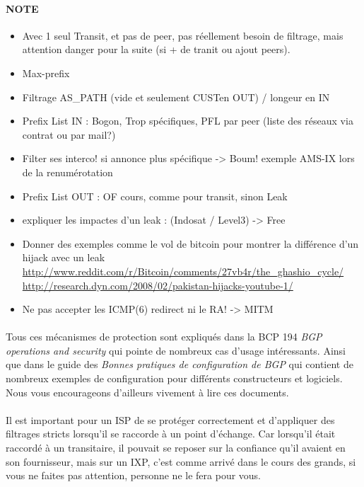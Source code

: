 \paragraph{NOTE}
\begin{itemize}
\item Avec 1 seul Transit, et pas de peer, pas réellement besoin de filtrage, mais attention danger pour la suite (si + de tranit ou ajout peers).
\item Max-prefix
\item Filtrage AS\_PATH (vide et seulement CUSTen OUT) / longeur en IN
\item Prefix List IN  : Bogon, Trop spécifiques, PFL par peer (liste des réseaux via contrat ou par mail?)
\item Filter ses interco! si annonce plus spécifique -> Boum! exemple AMS-IX lors de la renumérotation
\item Prefix List OUT : OF cours, comme pour transit, sinon Leak
\item expliquer les impactes d'un leak :  (Indosat / Level3) -> Free
\item Donner des exemples comme le vol de bitcoin pour montrer la différence d'un hijack avec un leak
\url{http://www.reddit.com/r/Bitcoin/comments/27vb4r/the_ghashio_cycle/}
\url{http://research.dyn.com/2008/02/pakistan-hijacks-youtube-1/}
\item Ne pas accepter les ICMP(6) redirect ni le RA! -> MITM
\end{itemize}

\paragraph{}
Tous ces mécanismes de protection sont expliqués dans la BCP 194 \emph{BGP operations and security} \cite{fenioux:BGPOPSEC} qui pointe de nombreux cas d'usage intéressants. Ainsi que dans le guide des \emph{Bonnes pratiques de configuration de BGP} \cite{fenioux:ANSSIBGP} qui contient de nombreux exemples de configuration pour différents constructeurs et logiciels. Nous vous encourageons d'ailleurs vivement à lire ces documents.

\paragraph{}
Il est important pour un ISP de se protéger correctement et d'appliquer des filtrages stricts lorsqu'il se raccorde à un point d'échange.
Car lorsqu'il était raccordé à un transitaire, il pouvait se reposer sur la confiance qu'il avaient en son fournisseur, mais sur un IXP, c'est comme arrivé dans le cours des grands, si vous ne faites pas attention, personne ne le fera pour vous.

